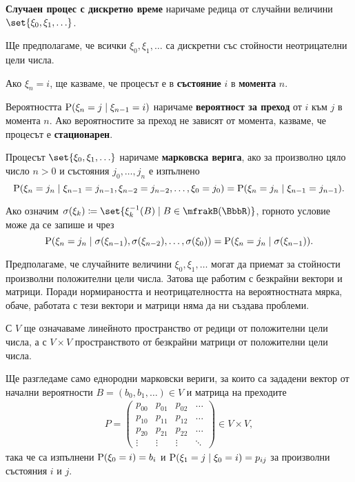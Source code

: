 \documentclass{../../common/topic}
\begin{document}
\begin{definition}
  \textbf{Случаен процес с дискретно време} наричаме редица от случайни величини \( \set{ \xi_0, \xi_1, \ldots } \).

  Ще предполагаме, че всички \( \xi_0, \xi_1, \ldots \) са дискретни със стойности неотрицателни цели числа.

  Ако \( \xi_n = i \), ще казваме, че процесът е в \textbf{състояние} \( i \) в \textbf{момента} \( n \).

  Вероятността \( \operatorname{P}(\xi_n = j \mid \xi_{n-1} = i) \) наричаме \textbf{вероятност за преход} от \( i \) към \( j \) в момента \( n \). Ако вероятностите за преход не зависят от момента, казваме, че процесът е \textbf{стационарен}.

  Процесът \( \set{ \xi_0, \xi_1, \ldots } \) наричаме \textbf{марковска верига}, ако за произволно цяло число \( n > 0 \) и състояния \( j_0, \ldots, j_n \) е изпълнено
  \begin{equation*}
    \operatorname{P}(\xi_n = j_n \mid \xi_{n-1} = j_{n-1}, \xi_{n-2} = j_{n-2}, \ldots, \xi_0 = j_0) = \operatorname{P}(\xi_n = j_n \mid \xi_{n-1} = j_{n-1}).
  \end{equation*}

  Ако означим \( \sigma(\xi_k) \coloneqq \set{ \xi_k^{-1}(B) \mid B \in \mfrakB(\BbbR) } \), горното условие може да се запише и чрез
  \begin{equation*}
    \operatorname{P}(\xi_n = j_n \mid \sigma(\xi_{n-1}), \sigma(\xi_{n-2}), \ldots, \sigma(\xi_0)) = \operatorname{P}(\xi_n = j_n \mid \sigma(\xi_{n-1})).
  \end{equation*}
\end{definition}

\begin{remark}
  Предполагаме, че случайните величини \( \xi_0, \xi_1, \ldots \) могат да приемат за стойности произволни положителни цели числа. Затова ще работим с безкрайни вектори и матрици. Поради нормираността и неотрицателността на вероятностната мярка, обаче, работата с тези вектори и матрици няма да ни създава проблеми.
\end{remark}

С \( V \) ще означаваме линейното пространство от редици от положителни цели числа, а с \( V \times V \) пространството от безкрайни матрици от положителни цели числа.

Ще разгледаме само еднородни марковски вериги, за които са зададени вектор от начални вероятности \( B = (b_0, b_1, \ldots) \in V \) и матрица на преходите
\begin{align*}
  P = \begin{pmatrix}
    p_{00} & p_{01} & p_{02} & \ldots \\
    p_{10} & p_{11} & p_{12} & \ldots \\
    p_{20} & p_{21} & p_{22} & \ldots \\
    \vdots & \vdots & \vdots & \ddots
  \end{pmatrix} \in V \times V,
\end{align*}
така че са изпълнени \( \operatorname{P}(\xi_0 = i) = b_i \) и \( \operatorname{P}(\xi_1 = j \mid \xi_0 = i) = p_{ij} \) за произволни състояния \( i \) и \( j \).
\end{document}
